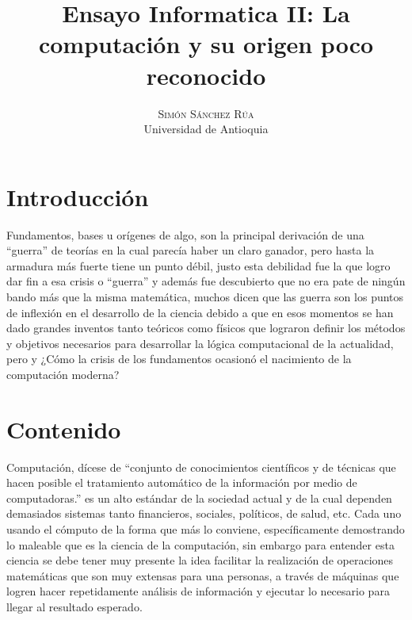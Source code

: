 \documentclass[a4paper,12pt]{article}
\title{ \bf Ensayo Informatica II:
              La computación y su origen poco reconocido}
\author{\textsc{Simón Sánchez Rúa} \\ Universidad de Antioquia}
\date{}
\theoremstyle{definition}
\begin{document}
\maketitle
 \noindent






\section{Introducción}
Fundamentos, bases u orígenes de algo, son la principal derivación de una “guerra” de teorías en la cual parecía haber un claro ganador, pero hasta la armadura más fuerte tiene un punto débil, justo esta debilidad fue la que logro dar fin a esa crisis o “guerra” y además fue descubierto que no era pate de ningún bando más que la misma matemática, muchos dicen que las guerra son los puntos de inflexión en el desarrollo de la ciencia debido a que en esos momentos se han dado grandes inventos  tanto teóricos como físicos que lograron definir los métodos y objetivos necesarios para desarrollar la lógica computacional de la actualidad, pero y ¿Cómo la crisis de los fundamentos ocasionó el nacimiento de la computación moderna?





\section{Contenido}
Computación, dícese de “conjunto de conocimientos científicos y de técnicas que hacen posible el tratamiento automático de la información por medio de computadoras.” \citep{ecured} es un alto estándar de la sociedad actual y de la cual dependen demasiados sistemas tanto financieros, sociales, políticos, de salud, etc. Cada uno usando el cómputo de la forma que más  lo conviene, específicamente demostrando lo maleable que es la ciencia de la computación, sin embargo para entender esta ciencia se debe tener muy presente la idea facilitar la realización de operaciones matemáticas que son muy extensas para una personas, a través de máquinas que logren hacer repetidamente análisis de información y ejecutar lo necesario para llegar al resultado esperado.
\end{document}
